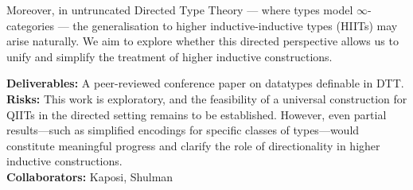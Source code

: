 \documentclass[a4paper,11pt]{article}
\renewcommand{\paragraph}[1]{\textbf{#1.}}
\begin{document}


Moreover, in untruncated Directed Type Theory — where types model
$\infty$-categories — the generalisation to higher inductive-inductive
types (HIITs) may arise naturally. We aim to explore whether this
directed perspective allows us to unify and simplify the treatment of
higher inductive constructions.

\textbf{Deliverables:} A peer-reviewed conference paper on datatypes
definable in DTT.\\
\textbf{Risks:} This work is exploratory, and the feasibility of a
universal construction for QIITs in the directed setting remains to be
established. However, even partial results—such as simplified
encodings for specific classes of types—would constitute meaningful
progress and clarify the role of directionality in higher inductive
constructions.\\
\textbf{Collaborators:} Kaposi, Shulman



\end{document}
